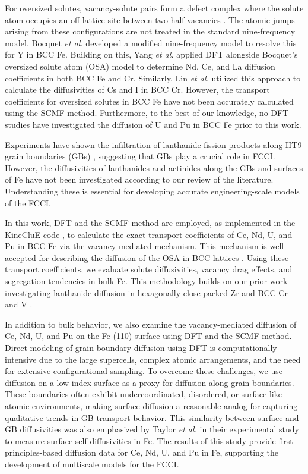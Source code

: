\documentclass[preprint,12pt]{elsarticle}
\begin{document}
For oversized solutes, vacancy-solute pairs form a defect complex where the solute atom occupies an off-lattice site between two half-vacancies \cite{bocquet_migration_2017}. The atomic jumps 
arising from these configurations are not treated in the standard nine-frequency model.
Bocquet \textit{et al.} \cite{bocquet_migration_2017} developed a modified nine-frequency model \cite{leclaire1970} to resolve this for Y in BCC Fe. Building on this, Yang \textit{et al.} \cite{yang_significant_2023} applied DFT alongside Bocquet’s oversized solute atom (OSA) model to determine Nd, Ce, and La diffusion coefficients in both BCC Fe and Cr. Similarly, Lin \textit{et al.} \cite{lin2024first} utilized this approach to calculate the diffusivities of Cs and I in BCC Cr. However, the transport coefficients for oversized solutes in BCC Fe have not been accurately calculated using the SCMF method. Furthermore, to the best of our knowledge, no DFT studies have investigated the diffusion of U and Pu in BCC Fe prior to this work.

Experiments have shown the infiltration of lanthanide fission products along HT9 grain boundaries (GBs) \cite{wang2022small, wang2024transmission}, suggesting that GBs play a crucial role in FCCI. However, the diffusivities of lanthanides and actinides along the GBs and surfaces of Fe have not been investigated according to our review of the literature. Understanding these is essential for developing accurate engineering-scale models of the FCCI.

In this work, DFT and the SCMF method are employed, as implemented in the KineCluE code \cite{schuler_kineclue_2020}, to calculate the exact transport coefficients of Ce, Nd, U, and Pu in BCC Fe via the vacancy-mediated mechanism. This mechanism is well accepted for describing the diffusion of the OSA in BCC lattices \cite{ bocquet_migration_2017,yang_significant_2023}. Using these transport coefficients, we evaluate solute diffusivities, vacancy drag effects, and segregation tendencies in bulk Fe. This methodology builds on our prior work investigating lanthanide diffusion in hexagonally close-packed Zr \cite{shousha2024first} and BCC Cr and V \cite{shousha_cr}. 

In addition to bulk behavior, we also examine the vacancy-mediated diffusion of Ce, Nd, U, and Pu on the Fe (110) surface using DFT and the SCMF method. Direct modeling of grain boundary diffusion using DFT is computationally intensive due to the large supercells, complex atomic arrangements, and the need for extensive configurational sampling. To overcome these challenges, we use diffusion on a low-index surface as a proxy for diffusion along grain boundaries. These boundaries often exhibit undercoordinated, disordered, or surface-like atomic environments, making surface diffusion a reasonable analog for capturing qualitative trends in GB transport behavior. This similarity between surface and GB diffusivities was also emphasized by Taylor \textit{et al.} \cite{taylor2024directly} in their experimental study to measure surface self-diffusivities in Fe.
The results of this study provide first-principles-based diffusion data for Ce, Nd, U, and Pu in Fe, supporting the development of multiscale models for the FCCI.
\end{document}
